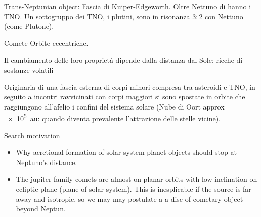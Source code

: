 \begin{frame}{Trans-Neptunian object: Fascia di Kuiper-Edgeworth.}
Oltre Nettuno di hanno i TNO.
Un sottogruppo dei TNO, i plutini, sono in risonanza $3:2$ con Nettuno (come Plutone).
\end{frame}

\begin{frame}{Comete}
Orbite eccentriche.

Il cambiamento delle loro propriet\'a dipende dalla distanza dal Sole: ricche di sostanze volatili

Originaria di una fascia esterna di corpi minori compresa tra asteroidi e TNO, in seguito a incontri ravvicinati con corpi maggiori si sono spostate in orbite che raggiungono all'afelio i confini del sistema solare (Nube di Oort approx \SI{e5}{\astronomicalunit}: quando diventa prevalente l'attrazione delle stelle vicine).
\end{frame}

\begin{frame}{Search motivation}
\begin{itemize}
\item Why acretional formation of solar system planet objects should stop at Neptuno's distance.
\item The jupiter family comets are almost on planar orbits with low inclination on ecliptic plane (plane of solar system). This is inesplicable if the source is far away and isotropic, so we may may postulate a a disc of cometary object beyond Neptun.
\end{itemize}
\end{frame}
